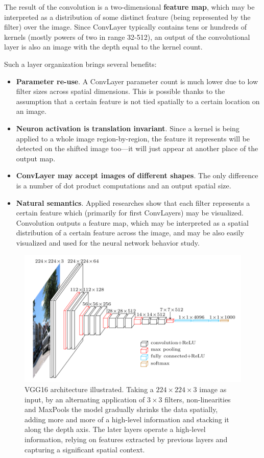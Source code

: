 \documentclass[thesis=B,english]{FITthesis}[2019/12/23]
\begin{document}
	The result of the convolution is a two-dimensional \textbf{feature map}, which may be interpreted as a distribution of some distinct feature (being represented by the filter) over the image. Since ConvLayer typically contains tens or hundreds of kernels (mostly powers of two in range 32-512), an output of the convolutional layer is also an image with the depth equal to the kernel count.
	
	\noindent
	Such a layer organization brings several benefits:
	\begin{itemize}
		\item \textbf{Parameter re-use}. A ConvLayer parameter count is much lower due to low filter sizes across spatial dimensions. This is possible thanks to the assumption that a certain feature is not tied spatially to a certain location on an image.
		\item \textbf{Neuron activation is translation invariant}. Since a kernel is being applied to a whole image region-by-region, the feature it represents will be detected on the shifted image too---it will just appear at another place of the output map.
		\item \textbf{ConvLayer may accept images of different shapes}. The only difference is a number of dot product computations and an output spatial size.
		\item \textbf{Natural semantics}. Applied researches\cite{zfnet} show that each filter represents a certain feature which (primarily for first ConvLayers) may be visualized. Convolution outputs a feature map, which may be interpreted as a spatial distribution of a certain feature across the image, and may be also easily visualized and used for the neural network behavior study.
	\end{itemize}
	
	\begin{figure}[h]
		\centering
		\includegraphics[scale=0.66]{images/vgg16.png}
		\caption{VGG16\cite{vgg} architecture illustrated. Taking a $224 \times 224 \times 3$ image as input, by an alternating application of $3 \times 3$ filters, non-linearities and MaxPools the model gradually shrinks the data spatially, adding more and more of a high-level information and stacking it along the depth axis. The later layers operate a high-level information, relying on features extracted by previous layers and capturing a significant spatial context.}
	\end{figure}
	
\end{document}
